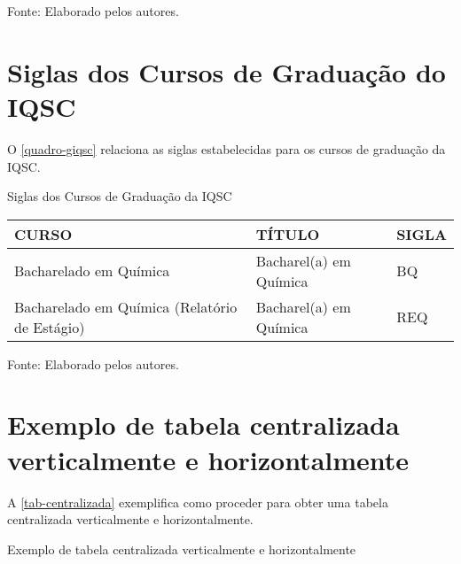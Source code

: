 \begin{apendicesenv}
\begin{quadro}[htb]
\begin{tabular}{|p{6.5cm}|p{6.5cm}|p{1.75cm}|}
	\end{tabular}
	\begin{flushleft}
		Fonte: Elaborado pelos autores.\
	\end{flushleft}
\end{quadro}

\chapter{Siglas dos Cursos de Graduação do IQSC}
O \autoref{quadro-giqsc} relaciona as siglas estabelecidas para os cursos de graduação da IQSC.
\begin{quadro}[htb]
	\ABNTEXfontereduzida
	\caption[Siglas dos Cursos de Graduação da IQSC]{Siglas dos Cursos de Graduação da IQSC}
	\label{quadro-giqsc}
	\begin{tabular}{|p{6.5cm}|p{6.5cm}|p{1.75cm}|}
		\hline
		\textbf{CURSO} & \textbf{TÍTULO} &  \textbf{SIGLA}  \\
		\hline
		Bacharelado em Química & Bacharel(a) em Química & BQ\\
		Bacharelado em Química (Relatório de Estágio)  & Bacharel(a) em Química & REQ\\
		\hline
		
	\end{tabular}
	\begin{flushleft}
		Fonte: Elaborado pelos autores.\
	\end{flushleft}
\end{quadro}

\chapter{Exemplo de tabela centralizada verticalmente e horizontalmente}
\index{tabelas}A \autoref{tab-centralizada} exemplifica como proceder para obter uma tabela centralizada verticalmente e horizontalmente.
\begin{table}[htb]
\ABNTEXfontereduzida
\caption[Exemplo de tabela centralizada verticalmente e horizontalmente]{Exemplo de tabela centralizada verticalmente e horizontalmente}
\label{tab-centralizada}


\end{table}
\end{apendicesenv}
